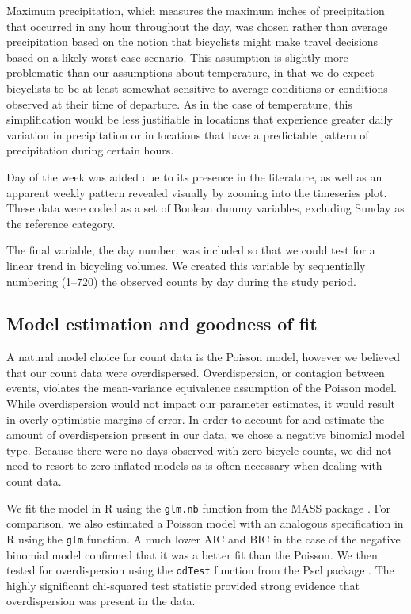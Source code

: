 \documentclass[12pt,letterpaper,article,twocolumn]{memoir}
\begin{document}
Maximum precipitation, which measures the maximum inches of
precipitation that occurred in any hour throughout the day, was chosen
rather than average precipitation based on the notion that bicyclists
might make travel decisions based on a likely worst case scenario.
This assumption is slightly more problematic than our assumptions
about temperature, in that we do expect bicyclists to be at least
somewhat sensitive to average conditions or conditions observed at
their time of departure. As in the case of temperature, this
simplification would be less justifiable in locations that experience
greater daily variation in precipitation or in locations that have a
predictable pattern of precipitation during certain hours.

Day of the week was added due to its presence in the literature, as
well as an apparent weekly pattern revealed visually by zooming into
the timeseries plot. These data were coded as a set of Boolean dummy
variables, excluding Sunday as the reference category.

The final variable, the day number, was included so that we could test
for a linear trend in bicycling volumes. We created this variable by
sequentially numbering (1--720) the observed counts by day during the
study period.

\FloatBarrier
\subsection*{Model estimation and goodness of fit}
A natural model choice for count data is the Poisson model, however we
believed that our count data were overdispersed. Overdispersion, or
contagion between events, violates the mean-variance equivalence
assumption of the Poisson model. While overdispersion would not impact
our parameter estimates, it would result in overly optimistic margins
of error. In order to account for and estimate the amount of
overdispersion present in our data, we chose a negative binomial model
type. Because there were no days observed with zero bicycle counts, we
did not need to resort to zero-inflated models as is often necessary
when dealing with count data.

We fit the model in R using the \texttt{glm.nb} function from the MASS
package \parencite{Venables:2002aa}. For comparison, we also estimated
a Poisson model with an analogous specification in R using the
\texttt{glm} function. A much lower AIC and BIC in the case of the
negative binomial model confirmed that it was a better fit than the
Poisson. We then tested for overdispersion using the \texttt{odTest}
function from the Pscl package \parencite{Jackman:2014aa}. The highly
significant chi-squared test statistic provided strong evidence that
overdispersion was present in the data.
\end{document}
